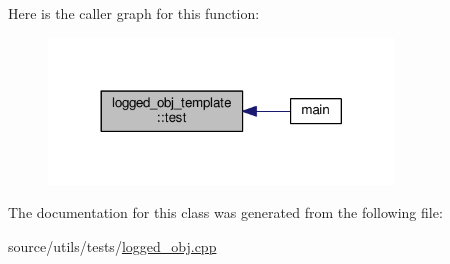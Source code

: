 Here is the caller graph for this function\-:\nopagebreak
\begin{figure}[H]
\begin{center}
\leavevmode
\includegraphics[width=260pt]{classlogged__obj__template_ab1b1cf9ed29eb291f0c67a4d8b9f1827_icgraph}
\end{center}
\end{figure}




The documentation for this class was generated from the following file\-:\begin{DoxyCompactItemize}
\item 
source/utils/tests/\hyperlink{logged__obj_8cpp}{logged\-\_\-obj.\-cpp}\end{DoxyCompactItemize}
